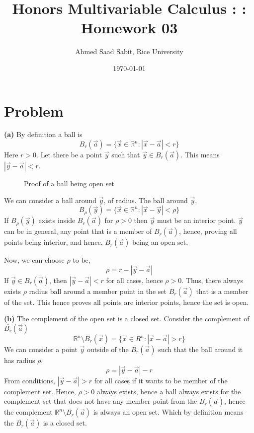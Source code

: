 \documentclass[letter]{article}
\title{Honors Multivariable Calculus : : Homework 03}
\author{Ahmed Saad Sabit, Rice University}
\date{\today}
\begin{document}
\maketitle

\section{Problem} 
\textbf{(a)}
By definition a ball is 
\[
B_r(\vec{a}) = \{\vec{x} \in \mathbb{R}^{n} : |\vec{x}-\vec{a}| < r\} 
\] 
Here $r>0$. Let there be a point $\vec{y}$  such that $\vec{y} \in B_r(\vec{a})$. This means $|\vec{y}-\vec{a}| < r$. 
\begin{figure}[ht]
    \centering
    \caption{Proof of a ball being open set}
    \label{fig:proof-of-a-ball-being-open-set}
\end{figure}
We can consider a ball around $\vec{y}$, of radius. The ball around $\vec{y}$, 
\[
B_\rho(\vec{y}) = \{\vec{x} \in \mathbb{R}^{n} : |\vec{x} - \vec{y}| < \rho\} 
\]
If $B_\rho(\vec{y})$ exists inside $B_r(\vec{a})$ for $\rho>0$ then $\vec{y}$ must be an interior point. $\vec{y}$ can be in general, any point that is a member of $B_r(\vec{a})$, hence, proving all points being interior, and hence, $B_r(\vec{a})$ being an open set.

Now, we can choose $\rho$ to be,
\[
\rho = r - |\vec{y} - \vec{a}|
\] 
If $\vec{y} \in B_r(\vec{a})$, then $|\vec{y}-\vec{a}|<r$ for all cases, hence $\rho > 0$. Thus, there always exists $\rho$ radius ball around a member point in the set $B_r(\vec{a})$ that is a member of the set. This hence proves all points are interior points, hence the set is open. 

\textbf{(b)}
The complement of the open set is a closed set. Consider the complement of $\overline{B_r}(\vec{a})$ 
\[
\mathbb{R}^{n} \setminus \overline{B_r}(\vec{x}) = \{\vec{x} \in R^{n} : |\vec{x}-\vec{a}| > r\} 
\] 
We can consider a point $\vec{y}$ outside of the $\overline{B_r}(\vec{a})$ such that the ball around it has radius $\rho$,
\[
\rho = |\vec{y}-\vec{a}| - r
\] 
From conditions, $|\vec{y}-\vec{a}| > r$ for all cases if it wants to be member of the complement set. Hence, $\rho>0$ always exists, hence a ball always exists for the complement set that does not have any member point from the $\overline{B_r}(\vec{a})$, hence the complement $\mathbb{R}^{n}\setminus \overline{B_r}(\vec{a})$ is always an open set. Which by definition means the $\overline{B_r}(\vec{a})$ is a closed set.
\end{document}
